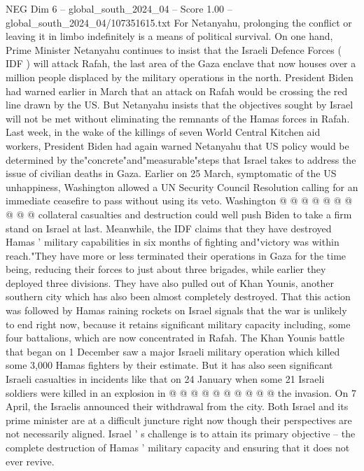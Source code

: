 \begin{textsample}{NEG Dim 6 – global\_south\_2024\_04 – Score 1.00 – global\_south\_2024\_04/107351615.txt}  \label{ex:f6_neg_358}
For Netanyahu, prolonging the conflict or leaving it in limbo indefinitely is a means of political survival.
On one hand, Prime Minister Netanyahu continues to insist that the Israeli Defence Forces ( IDF ) will attack Rafah, the last area of the Gaza enclave that now houses over a million people displaced by the military operations in the north.
President Biden had warned earlier in March that an attack on Rafah would be crossing the red line drawn by the US.
But Netanyahu insists that the objectives sought by Israel will not be met without eliminating the remnants of the Hamas forces in Rafah.
Last week, in the wake of the killings of seven World Central Kitchen aid workers, President Biden had again warned Netanyahu that US policy would be determined by the"concrete"and"measurable"steps that Israel takes to address the issue of civilian deaths in Gaza.
Earlier on 25 March, symptomatic of the US unhappiness, Washington allowed a UN Security Council Resolution calling for an immediate ceasefire to pass without using its veto.
Washington @ @ @ @ @ @ @ @ @ @ collateral casualties and destruction could well push Biden to take a firm stand on Israel at last.
Meanwhile, the IDF claims that they have destroyed Hamas ' military capabilities in six months of fighting and"victory was within reach."They have more or less terminated their operations in Gaza for the time being, reducing their forces to just about three brigades, while earlier they deployed three divisions.
They have also pulled out of Khan Younis, another southern city which has also been almost completely destroyed.
That this action was followed by Hamas raining rockets on Israel signals that the war is unlikely to end right now, because it retains significant military capacity including, some four battalions, which are now concentrated in Rafah.
The Khan Younis battle that began on 1 December saw a major Israeli military operation which killed some 3,000 Hamas fighters by their estimate.
But it has also seen significant Israeli casualties in incidents like that on 24 January when some 21 Israeli soldiers were killed in an explosion in @ @ @ @ @ @ @ @ @ @ the invasion.
On 7 April, the Israelis announced their withdrawal from the city.
Both Israel and its prime minister are at a difficult juncture right now though their perspectives are not necessarily aligned.
Israel ' s challenge is to attain its primary objective -- the complete destruction of Hamas ' military capacity and ensuring that it does not ever revive.

\end{textsample}
